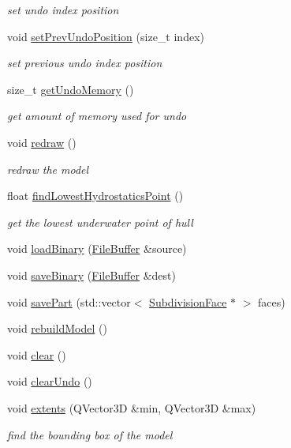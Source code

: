\begin{DoxyCompactItemize}
\begin{DoxyCompactList}\small\item\em set undo index position \end{DoxyCompactList}\item 
void \hyperlink{classShipCAD_1_1ShipCADModel_a27acd2ab4c6486a23db0b054962381bd}{set\-Prev\-Undo\-Position} (size\-\_\-t index)
\begin{DoxyCompactList}\small\item\em set previous undo index position \end{DoxyCompactList}\item 
size\-\_\-t \hyperlink{classShipCAD_1_1ShipCADModel_a0ab3edfdc89a6e297343d7c31b21658c}{get\-Undo\-Memory} ()
\begin{DoxyCompactList}\small\item\em get amount of memory used for undo \end{DoxyCompactList}\item 
void \hyperlink{classShipCAD_1_1ShipCADModel_af06c21c121f42e1ac4e5510d8c9ed3cd}{redraw} ()
\begin{DoxyCompactList}\small\item\em redraw the model \end{DoxyCompactList}\item 
float \hyperlink{classShipCAD_1_1ShipCADModel_a8cde3b7ca816132af3c722cd31af3107}{find\-Lowest\-Hydrostatics\-Point} ()
\begin{DoxyCompactList}\small\item\em get the lowest underwater point of hull \end{DoxyCompactList}\item 
void \hyperlink{classShipCAD_1_1ShipCADModel_ad3e49bc04c73dc221e48d15974b68f41}{load\-Binary} (\hyperlink{classShipCAD_1_1FileBuffer}{File\-Buffer} \&source)
\item 
void \hyperlink{classShipCAD_1_1ShipCADModel_a64c7c4ddffffdd1be2f27eb4210af2b7}{save\-Binary} (\hyperlink{classShipCAD_1_1FileBuffer}{File\-Buffer} \&dest)
\item 
void \hyperlink{classShipCAD_1_1ShipCADModel_a0d8f9cb2ce8038f6e65d90e8cab275e7}{save\-Part} (std\-::vector$<$ \hyperlink{classShipCAD_1_1SubdivisionFace}{Subdivision\-Face} $\ast$ $>$ faces)
\item 
void \hyperlink{classShipCAD_1_1ShipCADModel_a2e03bcc700adfcf768e257c91f5b0df9}{rebuild\-Model} ()
\item 
void \hyperlink{classShipCAD_1_1ShipCADModel_ad2f9dfd32667e9ac690de184b7e576f1}{clear} ()
\item 
void \hyperlink{classShipCAD_1_1ShipCADModel_a9d693b6b2180ce94e88224df49b909a2}{clear\-Undo} ()
\item 
void \hyperlink{classShipCAD_1_1ShipCADModel_a7ab84a738b747c4fcb2c3627e56d4bd0}{extents} (Q\-Vector3\-D \&min, Q\-Vector3\-D \&max)
\begin{DoxyCompactList}\small\item\em find the bounding box of the model \end{DoxyCompactList}\end{DoxyCompactItemize}


